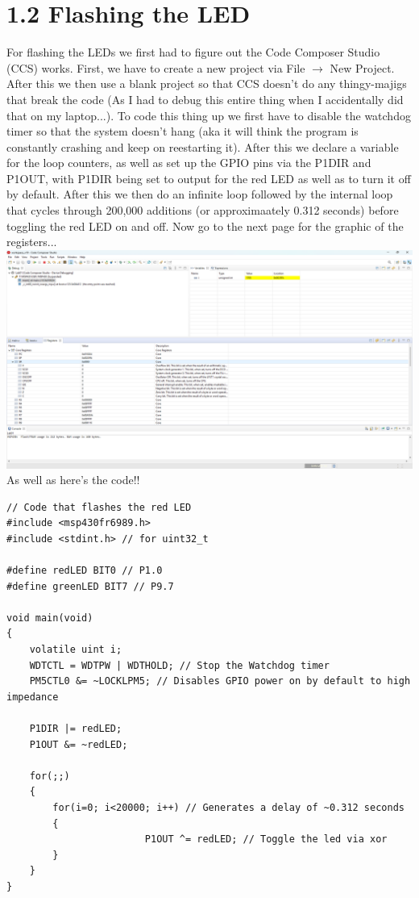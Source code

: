 \documentclass{article}
\begin{document}
\section{1.2 Flashing the LED}
For flashing the LEDs we first had to figure out the Code Composer Studio (CCS) works. First, we have to create a new project via File $\rightarrow$ New Project. After this we then use a blank project so that CCS doesn't do any thingy-majigs that break the code (As I had to debug this entire thing when I accidentally did that on my laptop...). To code this thing up we first have to disable the watchdog timer so that the system doesn't hang (aka it will think the program is constantly crashing and keep on reestarting it). After this we declare a variable for the loop counters, as well as set up the GPIO pins via the P1DIR and P1OUT, with P1DIR being set to output for the red LED as well as to turn it off by default. After this we then do an infinite loop followed by the internal loop that cycles through 200,000 additions (or approximaately 0.312 seconds) before toggling the red LED on and off.
\newline
Now go to the next page for the graphic of the registers...
\newpage
\hspace*{-145pt}\includegraphics[width=1.75\textwidth]{pictures/1_1.png}
\newline
As well as here's the code!!
\begin{lstlisting}
// Code that flashes the red LED
#include <msp430fr6989.h>
#include <stdint.h> // for uint32_t

#define redLED BIT0 // P1.0
#define greenLED BIT7 // P9.7

void main(void)
{
    volatile uint i;
    WDTCTL = WDTPW | WDTHOLD; // Stop the Watchdog timer
    PM5CTL0 &= ~LOCKLPM5; // Disables GPIO power on by default to high impedance

    P1DIR |= redLED;
    P1OUT &= ~redLED;

    for(;;)
    {
        for(i=0; i<20000; i++) // Generates a delay of ~0.312 seconds
        {
						P1OUT ^= redLED; // Toggle the led via xor
        }
    }
}
\end{lstlisting}
\end{document}
